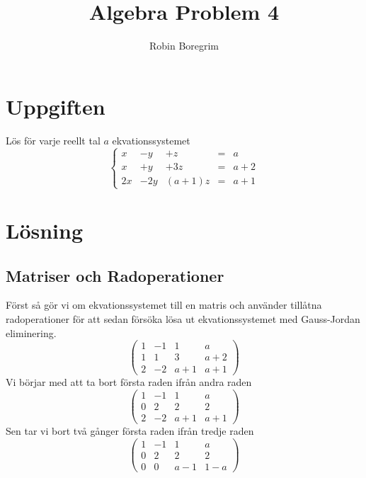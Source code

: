 \documentclass[11pt]{article}
\begin{document}
\title{Algebra Problem 4}
\author{Robin Boregrim}
\maketitle
\renewcommand{\contentsname}{Innehållsförteckning}
\tableofcontents
\newpage
\section{Uppgiften}
Lös för varje reellt tal $a$ ekvationssystemet\\
$$
\left\{\begin{array}{ccccc}
 x & -y & +z & = & a \\
 x & +y & +3z & = & a+2\\
 2x & -2y & (a+1)z & = & a+1
\end{array}\right.
$$



\section{Lösning}
\subsection{Matriser och Radoperationer}
Först så gör vi om ekvationssystemet till en matris och använder tillåtna radoperationer för att sedan försöka lösa ut ekvationssystemet med Gauss-Jordan eliminering.
$$
\left(\begin{array}{ccc|c}  
 1 & -1 & 1 & a \\
 1 & 1 & 3 & a+2\\
 2 & -2 & a+1 & a+1
\end{array}\right)
$$
Vi börjar med att ta bort första raden ifrån andra raden
$$
\left(\begin{array}{ccc|c}  
 1 & -1 & 1 & a \\
 0 & 2 & 2 & 2\\
 2 & -2 & a+1 & a+1
\end{array}\right)
$$
Sen tar vi bort två gånger första raden ifrån tredje raden
$$
\left(\begin{array}{ccc|c}  
 1 & -1 & 1 & a \\
 0 & 2 & 2 & 2\\
 0 & 0 & a-1 & 1-a
\end{array}\right)
$$
\end{document}
